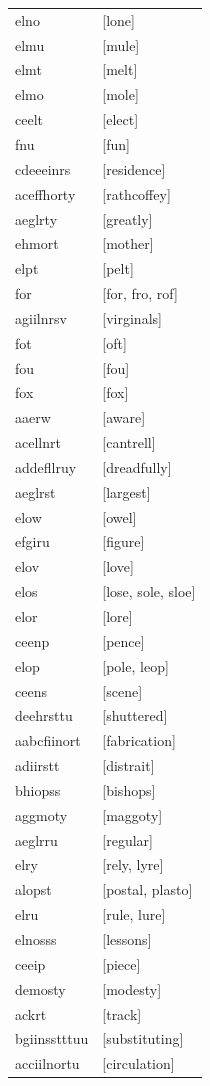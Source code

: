 \documentclass{article}
\begin{document}
\begin{tabular}{ll}
elno & [lone] \\
elmu & [mule] \\
elmt & [melt] \\
elmo & [mole] \\
ceelt & [elect] \\
fnu & [fun] \\
cdeeeinrs & [residence] \\
aceffhorty & [rathcoffey] \\
aeglrty & [greatly] \\
ehmort & [mother] \\
elpt & [pelt] \\
for & [for, fro, rof] \\
agiilnrsv & [virginals] \\
fot & [oft] \\
fou & [fou] \\
fox & [fox] \\
aaerw & [aware] \\
acellnrt & [cantrell] \\
addefllruy & [dreadfully] \\
aeglrst & [largest] \\
elow & [owel] \\
efgiru & [figure] \\
elov & [love] \\
elos & [lose, sole, sloe] \\
elor & [lore] \\
ceenp & [pence] \\
elop & [pole, leop] \\
ceens & [scene] \\
deehrsttu & [shuttered] \\
aabcfiinort & [fabrication] \\
adiirstt & [distrait] \\
bhiopss & [bishops] \\
aggmoty & [maggoty] \\
aeglrru & [regular] \\
elry & [rely, lyre] \\
alopst & [postal, plasto] \\
elru & [rule, lure] \\
elnosss & [lessons] \\
ceeip & [piece] \\
demosty & [modesty] \\
ackrt & [track] \\
bgiinsstttuu & [substituting] \\
acciilnortu & [circulation] \\

\end{tabular}
\end{document}
